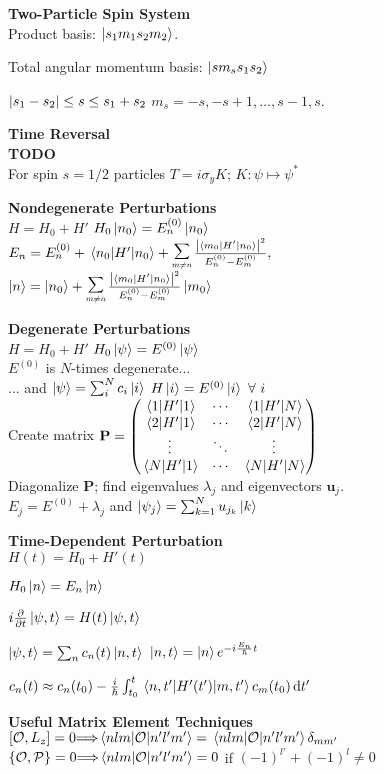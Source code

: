 \documentclass[11pt, a4paper]{article}
\newcommand{\newsec}[1]{\vspace{2mm}\textbf{#1}\\}
\newcommand{\diff}{\mathop{}\!\mathrm{d}} %
\renewcommand{\vec}[1]{\bm{#1}} %
\newcommand{\mat}[1]{\mathbf{#1}} %
\let\spaceyimplies\implies
\renewcommand{\implies}{\hspace{-1mm}\spaceyimplies\hspace{-1mm}}
\renewcommand{\O}{\mathcal{O}}  %
\renewcommand{\k}[1]{\ket{#1}}
\newcommand{\tsum}[1]{\raisebox{0.5ex}{\scalebox{0.8}{$\displaystyle \sum_{#1}\,$}}} %
\begin{document}
\begin{multicols}{2}
\newsec{Two-Particle Spin System}
Product basis: $ \ket{s_{1}m_{1}s_{2}m_{2}} $.

Total angular momentum basis: $ \k{sm_{s}s_{1}s_{2}} $

$ \abs{s_{1} - s_{2}} \leq s \leq s_{1} + s_{2}  $ \qquad $ m_{s} = -s, -s+1, \ldots, s-1, s $.



\newsec{Time Reversal}
\textbf{TODO}\\
For spin $ s = 1/2  $ particles $ T = i\sigma_{y}K $; $ K: \psi \mapsto \psi^{*} $



\newsec{Nondegenerate Perturbations}
$ H = H_{0} + H' $ \qquad $ H_{0} \ket{n_{0}} = E^{(0)}_{n} \ket{n_{0}} $ \\
$ E_{n} = E^{(0)}_{n} + \mel{n_{0}}{H'}{n_{0}} + \tsum{m\neq n}\frac{\abs{\mel{m_{0}}{H'}{n_{0}}}^{2}}{E^{(0)}_{n}-E^{(0)}_{m}}, $\\
$ \ket{n} = \ket{n_{0}} + \tsum{m\neq n}\frac{\abs{\bra{m_{0}}H'\ket{n_{0}}}^{2}}{E^{(0)}_{n}-E^{(0)}_{m}} \ket{m_{0}} $


\newsec{Degenerate Perturbations}
$ H = H_{0} + H' $ \qquad $ H_{0} \ket{\psi}  = E^{(0)} \ket{\psi} $\\
$ E^{(0)} $ is $ N $-times degenerate...\\[0.2em]
\null \quad ... and $ \ket{\psi} = \sum_{i}^{N}c_{i}\ket{i} $ \qquad $ H\ket{i} = E^{(0)} \ket{i} \ \forall \ i $\\
Create matrix
$ \mat{P} = 
\begin{pmatrix}
	\mel{1}{H'}{1} &  \cdots & \mel{1}{H'}{N} \\
	\mel{2}{H'}{1} & \cdots & \mel{2}{H'}{N} \\
	\vdots & \ddots & \vdots\\
	\mel{N}{H'}{1} &  \cdots & \mel{N}{H'}{N} 
\end{pmatrix} $\\
Diagonalize $ \mat{P} $; find eigenvalues $ \lambda_{j} $ and eigenvectors $ \vec{u}_{j} $.\\
$ E_{j} = E^{(0)} + \lambda_{j}  $ \qquad and \qquad $ \ket{\psi_{j}} = \sum_{k=1}^{N}u_{j_{k}} \ket{k} $

\newsec{Time-Dependent Perturbation}
$ H(t) = H_{0} + H'(t) $

$ H_{0}\ket{n} = E_{n}\ket{n} $
	
$ i \pdv{t} \ket{\psi, t} = H(t)\ket{\psi, t} $

$ \ket{\psi, t} = \sum_{n}c_{n}(t) \ket{n, t} $  \qquad $ \ket{n, t} = \ket{n}e^{-i\frac{E_{n}}{\hbar}t} $

$ c_{n}(t) \approx c_{n}(t_{0}) - \frac{i}{\hbar}\int_{t_{0}}^{t}\mel{n, t'}{H'(t')}{m, t'}c_{m}(t_{0}) \diff t' $


\newsec{Useful Matrix Element Techniques}
$ [\O, L_{z}] = 0 \implies \mel{nlm}{\mathcal{O}}{n'l'm'}  = \mel{nlm}{\mathcal{O}}{n'l'm'}\delta_{mm'} $\\
$ \{\O, \mathcal{P}\} = 0 \implies  \mel{nlm}{\O}{n'l'm'} = 0 $ if $ (-1)^{l'} + (-1)^{l} \neq 0  $
	


\end{multicols}
\end{document}
